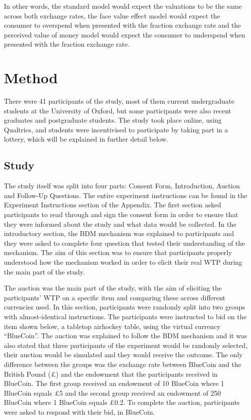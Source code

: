 \documentclass[
]{report}
\begin{document}
In other words, the standard model would expect the valuations to be the
same across both exchange rates, the face value effect model would
expect the consumer to overspend when presented with the fraction
exchange rate and the perceived value of money model would expect the
consumer to underspend when presented with the fraction exchange rate.

\chapter{Method}\label{method}

There were 41 participants of the study, most of them current
undergraduate students at the University of Oxford, but some
participants were also recent graduates and postgraduate students. The
study took place online, using Qualtrics, and students were incentivised
to participate by taking part in a lottery, which will be explained in
further detail below.

\section{Study}\label{study}

The study itself was split into four parts: Consent Form, Introduction,
Auction and Follow-Up Questions. The entire experiment instructions can
be found in the Experiment Instructions section of the Appendix. The
first section asked participants to read through and sign the consent
form in order to ensure that they were informed about the study and what
data would be collected. In the introductory section, the BDM mechanism
was explained to participants and they were asked to complete four
question that tested their understanding of the mechanism. The aim of
this section was to ensure that participants properly understood how the
mechanism worked in order to elicit their real WTP during the main part
of the study.

The auction was the main part of the study, with the aim of eliciting
the participants' WTP on a specific item and comparing these across
different currencies used. In this section, participants were randomly
split into two groups with almost-identical instructions. The
participants were instructed to bid on the item shown below, a tabletop
airhockey table, using the virtual currency ``BlueCoin''. The auction
was explained to follow the BDM mechanism and it was also stated that
three participants of the experiment would be randomly selected, their
auction would be simulated and they would receive the outcome. The only
difference between the groups was the exchange rate between BlueCoin and
the British Pound (£) and the endowment that the participants received
in BlueCoin. The first group received an endowment of 10 BlueCoin where
1 BlueCoin equals £5 and the second group received an endowment of 250
BlueCoin where 1 BlueCoin equals £0.2. To complete the auction,
participants were asked to respond with their bid, in BlueCoin.
\end{document}
